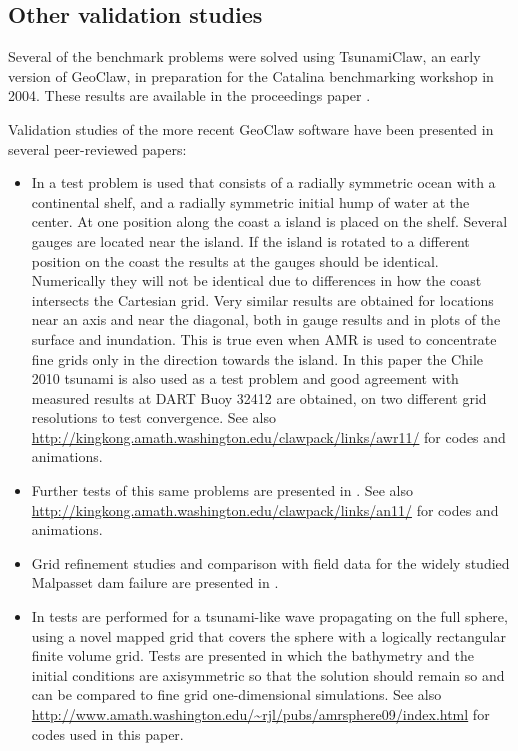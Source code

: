 \documentclass[11pt]{article}
\begin{document}
\subsection{Other validation studies}

Several of the benchmark problems were solved using TsunamiClaw, an early
version of GeoClaw, in preparation for the Catalina
benchmarking workshop in 2004.  These results are available in the
proceedings paper \cite{rjl-george:catalina04a}.

Validation studies of the more 
recent GeoClaw software have been presented in several
peer-reviewed papers:

\begin{itemize}
\item In \cite{BergerGeorgeLeVequeMandli:awr11} a test problem is used that
consists of a radially symmetric ocean with a continental shelf, and
a radially symmetric initial
hump of water at the center.  At one position along the coast a 
island is placed on the shelf.  Several gauges are located near the island.
If the island is rotated to a different position on the coast the results at
the gauges should be identical.  Numerically they will not be identical due
to differences in how the coast intersects the Cartesian grid.  Very similar
results are obtained for locations near an axis and near the diagonal, both
in gauge results and in plots of the surface and inundation.  This is true
even when AMR is used to concentrate fine grids only in the direction
towards the island.  In this paper the Chile 2010 tsunami is also used as a
test problem and good agreement with measured results at DART Buoy 32412
are obtained, on two different grid resolutions to test convergence.
See also 
\url{http://kingkong.amath.washington.edu/clawpack/links/awr11/}
for codes and animations.


\item Further tests of this same problems are presented in
\cite{LeVequeGeorgeBerger:an11}.  
See also 
\url{http://kingkong.amath.washington.edu/clawpack/links/an11/}
for codes and animations.

\item Grid refinement studies and comparison with field data for the widely
studied Malpasset dam failure are presented in \cite{George:Malpasset}.

\item In \cite{mjb-dac-ch-rjl:amrsphere09} tests are performed for a
tsunami-like wave propagating on the full sphere, using a novel mapped grid
that covers the sphere with a logically rectangular finite volume grid.
Tests are presented in which the bathymetry and the initial conditions are
axisymmetric so that the solution should remain so and can be compared to
fine grid one-dimensional simulations.  
See also 
\url{http://www.amath.washington.edu/~rjl/pubs/amrsphere09/index.html}
for codes used in this paper.
\end{itemize} 
\end{document}
